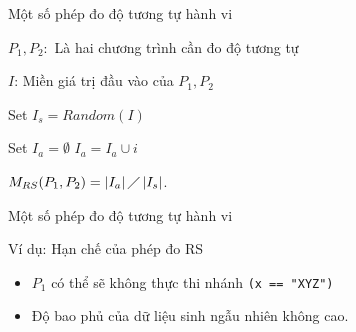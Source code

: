 \begin{frame}{Một số phép đo độ tương tự hành vi}
\begin{algorithm}[H]
\begin{algorithmic}[1]
\item $P_{1}, P_{2}:$ Là hai chương trình cần đo độ tương tự
\item $I$: Miền giá trị đầu vào của $P_{1}, P_{2}$
\item Set $I_{s} = Random(I)$ 
\item Set $I_{a} = \emptyset$
	\STATE $I_{a} = I_{a} \cup i$
\ENDIF
\ENDFOR
\item $M_{RS}(P_{1}, P_{2}) = \left|I_{a}\right| \diagup
    \left|I_{s}\right| $.
\end{algorithmic}
\caption{Thuật toán phép đo RS }
\label{alg:seq}
\end{algorithm}
\end{frame}

\begin{frame}{Một số phép đo độ tương tự hành vi}
\begin{exampleblock}{Ví dụ: Hạn chế của phép đo RS}
	\begin{minipage}[t]{0.45\linewidth}
	
	\end{minipage}%
	\hfill\vrule\hfill
	\begin{minipage}[t]{0.45\linewidth}
		
	\end{minipage}%
\end{exampleblock}
\begin{itemize}
	\item $P_{1}$ có thể sẽ không thực thi nhánh \texttt{(x == "XYZ")}
	\item Độ bao phủ của dữ liệu sinh ngẫu nhiên không cao.
\end{itemize}
\end{frame}

